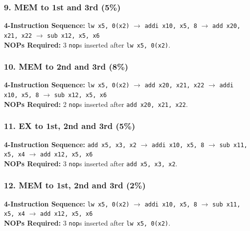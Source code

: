 \documentclass[11pt, a4paper]{article}
\begin{document}
\subsubsection*{9. MEM to 1st and 3rd (5\%)}
\textbf{4-Instruction Sequence:} \texttt{lw x5, 0(x2)} $\rightarrow$ \texttt{addi x10, x5, 8} $\rightarrow$ \texttt{add x20, x21, x22} $\rightarrow$ \texttt{sub x12, x5, x6} \\
\textbf{NOPs Required:} 3 \texttt{nop}s inserted after \texttt{lw x5, 0(x2)}.


\subsubsection*{10. MEM to 2nd and 3rd (8\%)}
\textbf{4-Instruction Sequence:} \texttt{lw x5, 0(x2)} $\rightarrow$ \texttt{add x20, x21, x22} $\rightarrow$ \texttt{addi x10, x5, 8} $\rightarrow$ \texttt{sub x12, x5, x6} \\
\textbf{NOPs Required:} 2 \texttt{nop}s inserted after \texttt{add x20, x21, x22}.


\subsubsection*{11. EX to 1st, 2nd and 3rd (5\%)}
\textbf{4-Instruction Sequence:} \texttt{add x5, x3, x2} $\rightarrow$ \texttt{addi x10, x5, 8} $\rightarrow$ \texttt{sub x11, x5, x4} $\rightarrow$ \texttt{add x12, x5, x6} \\
\textbf{NOPs Required:} 3 \texttt{nop}s inserted after \texttt{add x5, x3, x2}.


\subsubsection*{12. MEM to 1st, 2nd and 3rd (2\%)}
\textbf{4-Instruction Sequence:} \texttt{lw x5, 0(x2)} $\rightarrow$ \texttt{addi x10, x5, 8} $\rightarrow$ \texttt{sub x11, x5, x4} $\rightarrow$ \texttt{add x12, x5, x6} \\
\textbf{NOPs Required:} 3 \texttt{nop}s inserted after \texttt{lw x5, 0(x2)}.

\end{document}
